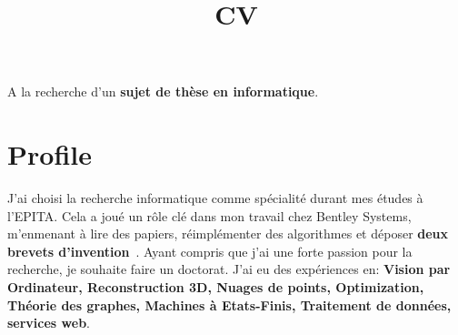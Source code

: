 \documentclass[11pt,a4paper,sans]{moderncv}
\title{CV}
\begin{document}
\makecvtitle
\vspace{-1cm}
\begin{center}
  A la recherche d'un \textbf{sujet de thèse en informatique}.
\end{center}

\section{Profile}
J'ai choisi la recherche informatique comme spécialité durant mes études à l'EPITA.
Cela a joué un rôle clé dans mon travail chez Bentley Systems, m'enmenant à lire des papiers,
réimplémenter des algorithmes et déposer
\textbf{deux brevets d'invention}~\cite{patent.scanfinder1,patent.scanfinder2}.
Ayant compris que j'ai une forte passion pour la recherche, je souhaite faire un doctorat.
J'ai eu des expériences en:
\textbf{Vision par Ordinateur, Reconstruction 3D, Nuages de points, Optimization, Théorie des graphes,
Machines à Etats-Finis, Traitement de données, services web}.
\end{document}
